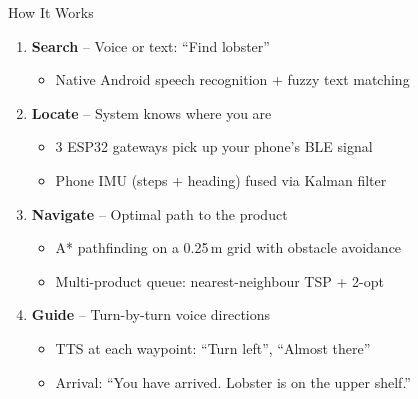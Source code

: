 \documentclass[aspectratio=169,12pt]{beamer}
\begin{document}
\begin{frame}{How It Works}
\begin{enumerate}
    \item \textbf{Search} -- Voice or text: ``Find lobster''
    \begin{itemize}
        \item Native Android speech recognition + fuzzy text matching
    \end{itemize}
    \item \textbf{Locate} -- System knows where you are
    \begin{itemize}
        \item 3 ESP32 gateways pick up your phone's BLE signal
        \item Phone IMU (steps + heading) fused via Kalman filter
    \end{itemize}
    \item \textbf{Navigate} -- Optimal path to the product
    \begin{itemize}
        \item A* pathfinding on a 0.25\,m grid with obstacle avoidance
        \item Multi-product queue: nearest-neighbour TSP + 2-opt
    \end{itemize}
    \item \textbf{Guide} -- Turn-by-turn voice directions
    \begin{itemize}
        \item TTS at each waypoint: ``Turn left'', ``Almost there''
        \item Arrival: ``You have arrived. Lobster is on the upper shelf.''
    \end{itemize}
\end{enumerate}
\end{frame}
\end{document}
